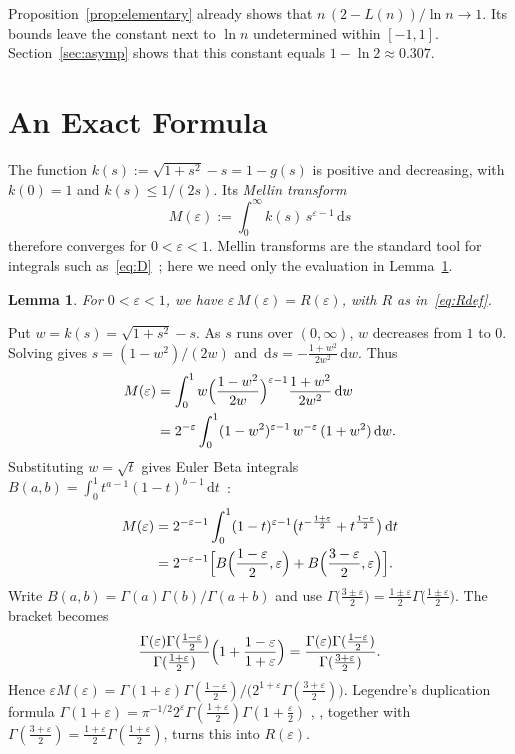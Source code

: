 \documentclass[journal]{IEEEtran}
\newtheorem{lemma}{Lemma}
\newcommand{\eps}{\varepsilon}
\newcommand{\dd}{\,\mathrm{d}}
\begin{document}
Proposition~\ref{prop:elementary} already shows that $n\,(2-L(n))/\ln n\to1$. Its bounds leave
the constant next to $\ln n$ undetermined within $[-1,1]$. Section~\ref{sec:asymp} shows that
this constant equals $1-\ln2\approx0.307$.

\section{An Exact Formula}\label{sec:exact}

The function $k(s):=\sqrt{1+s^2}-s=1-g(s)$ is positive and decreasing, with $k(0)=1$ and
$k(s)\le1/(2s)$. Its \emph{Mellin transform}
\begin{equation}\label{eq:mellin}
  M(\eps):=\int_0^\infty k(s)\,s^{\eps-1}\dd s
\end{equation}
therefore converges for $0<\eps<1$. Mellin transforms are the standard tool for integrals such
as~\eqref{eq:D}~\cite{FGD,Wong}; here we need only the evaluation in Lemma~\ref{lem:mellin}.

\begin{lemma}\label{lem:mellin}
For $0<\eps<1$, we have $\eps\,M(\eps)=R(\eps)$, with $R$ as in~\eqref{eq:Rdef}.
\end{lemma}

\begin{IEEEproof}
Put $w=k(s)=\sqrt{1+s^2}-s$. As $s$ runs over $(0,\infty)$, $w$ decreases from $1$ to $0$.
Solving gives $s=(1-w^2)/(2w)$ and $\dd s=-\frac{1+w^2}{2w^2}\dd w$. Thus
\begin{align*}
  M(\eps)&=\int_0^1 w\Bigl(\frac{1-w^2}{2w}\Bigr)^{\eps-1}\frac{1+w^2}{2w^2}\dd w\\
  &=2^{-\eps}\int_0^1(1-w^2)^{\eps-1}\,w^{-\eps}\,(1+w^2)\dd w.
\end{align*}
Substituting $w=\sqrt t$ gives Euler Beta integrals
$B(a,b)=\int_0^1t^{a-1}(1-t)^{b-1}\dd t$~\cite[Eq.~5.12.1]{DLMF}:
\begin{align*}
  M(\eps)&=2^{-\eps-1}\int_0^1(1-t)^{\eps-1}
    \bigl(t^{-\frac{1+\eps}{2}}+t^{\frac{1-\eps}{2}}\bigr)\dd t\\
  &=2^{-\eps-1}\Bigl[B\Bigl(\frac{1-\eps}{2},\eps\Bigr)+B\Bigl(\frac{3-\eps}{2},\eps\Bigr)\Bigr].
\end{align*}
Write $B(a,b)=\Gamma(a)\Gamma(b)/\Gamma(a+b)$ and use
$\Gamma\bigl(\frac{3\pm\eps}{2}\bigr)=\frac{1\pm\eps}{2}\Gamma\bigl(\frac{1\pm\eps}{2}\bigr)$.
The bracket becomes
\[
  \frac{\Gamma(\eps)\Gamma(\frac{1-\eps}{2})}{\Gamma(\frac{1+\eps}{2})}
  \Bigl(1+\frac{1-\eps}{1+\eps}\Bigr)
  =\frac{\Gamma(\eps)\Gamma(\frac{1-\eps}{2})}{\Gamma(\frac{3+\eps}{2})}.
\]
Hence $\eps M(\eps)=\Gamma(1+\eps)\Gamma(\frac{1-\eps}{2})\big/
\bigl(2^{1+\eps}\Gamma(\frac{3+\eps}{2})\bigr)$. Legendre's duplication formula
$\Gamma(1+\eps)=\pi^{-1/2}2^{\eps}\Gamma(\frac{1+\eps}{2})\Gamma(1+\frac{\eps}{2})$
\cite[Eq.~5.5.5]{DLMF}, \cite[Ch.~1]{AAR}, together with
$\Gamma(\frac{3+\eps}{2})=\frac{1+\eps}{2}\Gamma(\frac{1+\eps}{2})$, turns this into
$R(\eps)$.
\end{IEEEproof}
\end{document}
